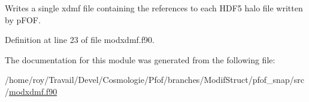 Writes a single xdmf file containing the references to each H\-D\-F5 halo file written by p\-F\-O\-F. 



Definition at line 23 of file modxdmf.\-f90.



The documentation for this module was generated from the following file\-:\begin{DoxyCompactItemize}
\item 
/home/roy/\-Travail/\-Devel/\-Cosmologie/\-Pfof/branches/\-Modif\-Struct/pfof\-\_\-snap/src/\hyperlink{pfof__snap_2src_2modxdmf_8f90}{modxdmf.\-f90}\end{DoxyCompactItemize}

